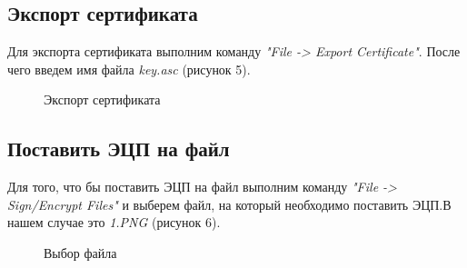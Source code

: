 \documentclass[10pt,a4paper]{report}
\begin{document}
\subsection{Экспорт сертификата}
Для экспорта сертификата выполним команду \textit{"File ->  Export Certificate"}. После чего введем имя файла \textit{key.asc} (рисунок 5).
\begin{figure}[h]
	\caption{Экспорт сертификата}
\end{figure}

\subsection{Поставить ЭЦП на файл}
Для того, что бы поставить ЭЦП на файл выполним команду \textit{"File -> Sign/Encrypt Files"} и выберем файл, на который необходимо поставить ЭЦП.В нашем случае это \textit{1.PNG} (рисунок 6).
\begin{figure}[h]
	\caption {Выбор файла}
\end{figure}
\end{document}
